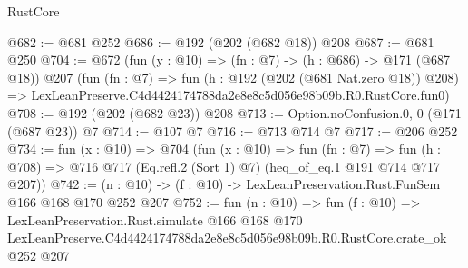 \begin{lexlean}{RustCore}
\begin{coremodule}
@682 := @681 @252
@686 := @192 (@202 (@682 @18)) @208
@687 := @681 @250
@704 := @672
    (fun (y : @10) => (fn : @7) -> (h : @686) -> @171 (@687 @18))
    @207
    (fun (fn : @7) =>
    fun (h : @192 (@202 (@681 Nat.zero @18)) @208) =>
    LexLeanPreserve.C4d4424174788da2e8e8c5d056e98b09b.R0.RustCore.fun0)
@708 := @192 (@202 (@682 @23)) @208
@713 := Option.noConfusion.{0, 0} (@171 (@687 @23)) @7
@714 := @107 @7
@716 := @713 @714 @7
@717 := @206 @252
@734 := fun (x : @10) =>
  @704
    (fun (x : @10) =>
    fun (fn : @7) =>
    fun (h : @708) => @716 @717 (Eq.refl.{2} (Sort 1) @7) (heq_of_eq.{1} @191 @714 @717 @207))
@742 := (n : @10) -> (f : @10) -> LexLeanPreservation.Rust.FunSem @166 @168 @170 @252 @207
@752 := fun (n : @10) =>
  fun (f : @10) =>
  LexLeanPreservation.Rust.simulate
    @166
    @168
    @170
    LexLeanPreserve.C4d4424174788da2e8e8c5d056e98b09b.R0.RustCore.crate_ok
    @252
    @207
\end{coremodule}
\end{lexlean}

